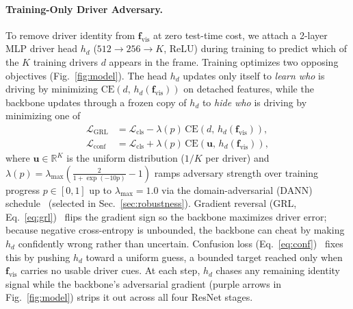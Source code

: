 \paragraph{Training-Only Driver Adversary.}
To remove driver identity from $\mathbf{f}_{\text{vis}}$ at zero test-time cost, we attach a 2-layer MLP driver head $h_d$ ($512 \!\to\! 256 \!\to\! K$, ReLU) during training to predict which of the $K$ training drivers $d$ appears in the frame. Training optimizes two opposing objectives (Fig.~\ref{fig:model}). The head $h_d$ updates only itself to \emph{learn who} is driving by minimizing $\mathrm{CE}(d,\, h_d(\mathbf{f}_{\text{vis}}))$ on detached features, while the backbone updates through a frozen copy of $h_d$ to \emph{hide who} is driving by minimizing one of
\begin{align}
  \mathcal{L}_{\text{GRL}} &= \mathcal{L}_{\text{cls}} - \lambda(p)\,\mathrm{CE}\!\left(d,\, h_d(\mathbf{f}_{\text{vis}})\right),
  \label{eq:grl} \\
  \mathcal{L}_{\text{conf}} &= \mathcal{L}_{\text{cls}} + \lambda(p)\,\mathrm{CE}\!\left(\mathbf{u},\, h_d(\mathbf{f}_{\text{vis}})\right),
  \label{eq:conf}
\end{align}
where $\mathbf{u} \in \mathbb{R}^K$ is the uniform distribution ($1/K$ per driver) and $\lambda(p) = \lambda_{\max}\!\left(\tfrac{2}{1 + \exp(-10p)} - 1\right)$ ramps adversary strength over training progress $p \in [0, 1]$ up to $\lambda_{\max} = 1.0$ via the domain-adversarial (DANN) schedule~\cite{ganin2016dann} (selected in Sec.~\ref{sec:robustness}). Gradient reversal (GRL, Eq.~\ref{eq:grl})~\cite{ganin2016dann} flips the gradient sign so the backbone maximizes driver error; because negative cross-entropy is unbounded, the backbone can cheat by making $h_d$ confidently wrong rather than uncertain. Confusion loss (Eq.~\ref{eq:conf})~\cite{tzeng2015confusion,alvi2018turning} fixes this by pushing $h_d$ toward a uniform guess, a bounded target reached only when $\mathbf{f}_{\text{vis}}$ carries no usable driver cues. At each step, $h_d$ chases any remaining identity signal while the backbone's adversarial gradient (purple arrows in Fig.~\ref{fig:model}) strips it out across all four ResNet stages.


